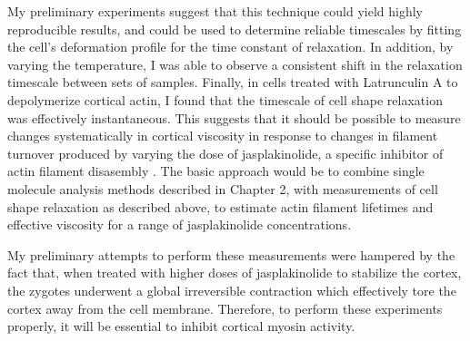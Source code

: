 My preliminary experiments suggest that this technique could yield highly reproducible results, and could be used to determine reliable timescales by fitting the cell's deformation profile for the time constant of relaxation.  In addition, by varying the temperature, I was able to observe  a consistent shift in the relaxation timescale between sets of samples.  Finally, in cells treated  with Latrunculin A to depolymerize cortical actin,  I found that the timescale of cell shape relaxation was effectively instantaneous.  This suggests that it should be possible to measure changes systematically in cortical viscosity in response to changes in filament turnover produced by varying the dose of  jasplakinolide, a specific inhibitor of actin filament disasembly \cite{Peng2011}. The basic approach would be to combine single molecule analysis methods described  in Chapter 2, with measurements of cell shape relaxation as described above, to estimate actin filament lifetimes and effective viscosity for a range of jasplakinolide concentrations.  

My preliminary attempts to perform  these measurements were hampered by the fact that, when treated with higher doses of jasplakinolide to stabilize the cortex, the zygotes underwent a global irreversible contraction which effectively tore the cortex away from the cell membrane. Therefore, to perform these experiments properly, it will be essential to inhibit cortical  myosin activity.   





